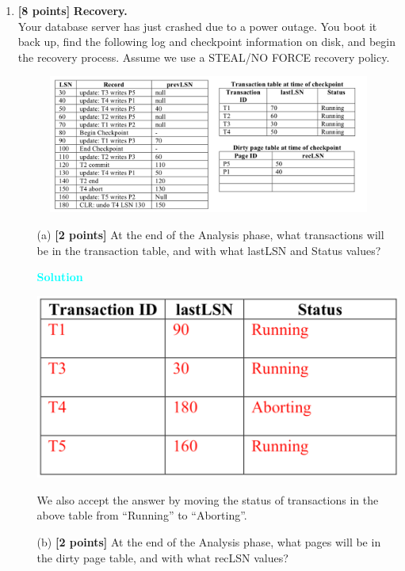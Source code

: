 \documentclass[10pt]{article}
\newenvironment{solution}
    { \begin{mdframed}[backgroundcolor=gray!10] \textcolor{cyan}{\textbf{Solution}} \\}
    {  \end{mdframed}}
\begin{document}
\begin{enumerate}
	\item \textbf{[8 points]} \textbf{Recovery.} \\
	      Your database server has just crashed due to a power outage.
	      You boot it back up, find the following log and checkpoint information on disk,
	      and begin the recovery process. Assume we use a STEAL/NO FORCE recovery policy.
	      \begin{figure}[h]
		      \centering
		      \includegraphics[width=\linewidth]{recovery}
		      \label{fig:recovery}
	      \end{figure}
	      \begin{itemize}
		      \item[(a)] \textbf{[2 points]}
		            At the end of the Analysis phase, what transactions will be in the transaction table,
		            and with what lastLSN and Status values?
		            \begin{solution}
			            \begin{center}
				            \includegraphics[width=.6\linewidth]{Xact_sol.png}
			            \end{center}
		            \end{solution}
		            We also accept the answer by moving the status of transactions in the above table from ``Running'' to ``Aborting''.
		      \item[(b)] \textbf{[2 points]}
		            At the end of the Analysis phase, what pages will be in the dirty page table, and with what recLSN values?

\end{itemize}
\end{enumerate}
\end{document}
